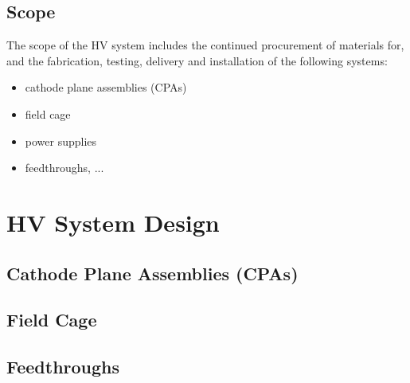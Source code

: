 

\subsection{Scope}
\label{sec:fdsp-hv-scope}

The scope of the HV system includes the continued procurement of materials for, and the fabrication, testing, delivery and installation of the following systems: 


\begin{itemize}
\item cathode plane assemblies (CPAs)
\item field cage
\item power supplies 
\item feedthroughs, ...
\end{itemize}



\section{HV System Design}
\label{sec:fdsp-hv-design}




\subsection{Cathode Plane Assemblies (CPAs)}
\label{sec:fdsp-hv-cpa}


\subsection{Field Cage}
\label{sec:fdsp-hv-fc}

\subsection{Feedthroughs}
\label{sec:fdsp-hv-feed}


